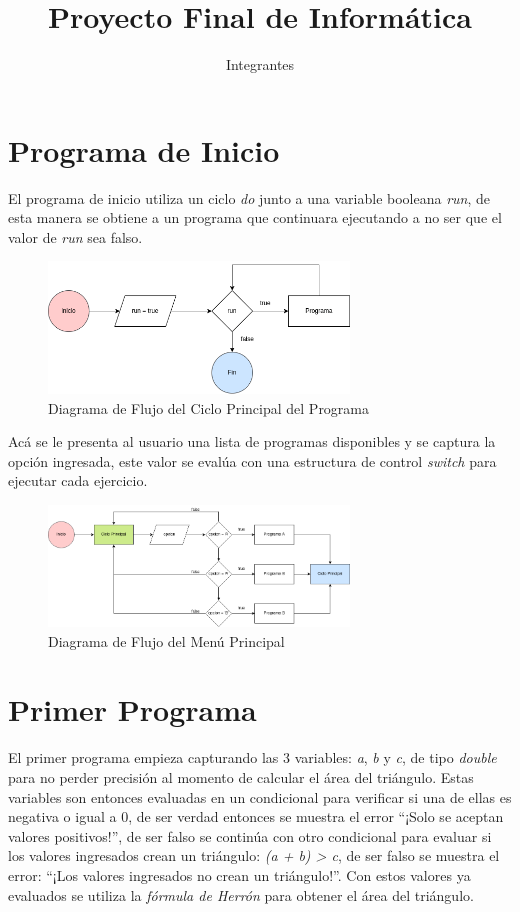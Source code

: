 \documentclass{article}
\title{Proyecto Final de Informática}
\author{Integrantes}
\begin{document}
    \maketitle
    
\section{Programa de Inicio}

El programa de inicio utiliza un ciclo \emph{do} junto a una variable booleana \emph{run}, de esta manera se obtiene a un programa que continuara ejecutando a no ser que el valor de \emph{run} sea falso. 

\begin{figure}[h]
    \centering
        \centering
    \includegraphics[width=8cm]{loop_inicio}
    \centering
        \centering
        \caption{Diagrama de Flujo del Ciclo Principal del Programa}
\end{figure}

Acá se le presenta al usuario una lista de programas disponibles y se captura la opción ingresada, este valor se evalúa con una estructura de control \emph{switch} para ejecutar cada ejercicio.

\begin{figure}[h]
    \centering
    \includegraphics[width=8cm]{switch_programa}
    \caption{Diagrama de Flujo del Menú Principal}
\end{figure}

\section{Primer Programa}

El primer programa empieza capturando las 3 variables: \emph{a}, \emph{b} y \emph{c}, de tipo \emph{double} para no perder precisión al momento de calcular el área del triángulo. Estas variables son entonces evaluadas en un condicional para verificar si una de ellas es negativa o igual a 0, de ser verdad entonces se muestra el error ``¡Solo se aceptan valores positivos!'', de ser falso se continúa con otro condicional para evaluar si los valores ingresados crean un triángulo: \emph{(a + b) > c}, de ser falso se muestra el error: ``¡Los valores ingresados no crean un triángulo!''. Con estos valores ya evaluados se utiliza la \emph{fórmula de Herrón} para obtener el área del triángulo.
\end{document}
